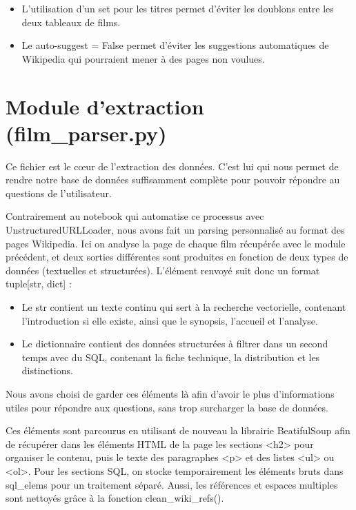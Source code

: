 \documentclass[11pt]{report}
\begin{document}
    \begin{itemize}
        \item L'utilisation d'un set pour les titres permet d'éviter les doublons entre les deux tableaux de
        films.
        \item Le auto-suggest = False permet d'éviter les suggestions automatiques de Wikipedia qui
        pourraient mener à des pages non voulues.
    \end{itemize}
 
    \section{Module d'extraction (film\_parser.py)}
 
    Ce fichier est le cœur de l'extraction des données. C'est lui qui nous permet de rendre notre base de
    données suffisamment complète pour pouvoir répondre au questions de l'utilisateur.
 
    Contrairement au notebook qui automatise ce processus avec UnstructuredURLLoader, nous avons
    fait un parsing personnalisé au format des pages Wikipedia. Ici on analyse la page de chaque film
    récupérée avec le module précédent, et deux sorties différentes sont produites en fonction de deux
    types de données (textuelles et structurées). L'élément renvoyé suit donc un format tuple[str, dict] :
 
    \begin{itemize}
        \item Le str contient un texte continu qui sert à la recherche vectorielle, contenant l'introduction si
        elle existe, ainsi que le synopsis, l'accueil et l'analyse.
        \item Le dictionnaire contient des données structurées à filtrer dans un second temps avec du
        SQL, contenant la fiche technique, la distribution et les distinctions.
    \end{itemize}
 
    Nous avons choisi de garder ces éléments là afin d'avoir le plus d'informations utiles pour répondre
    aux questions, sans trop surcharger la base de données.
 
    Ces éléments sont parcourus en utilisant de nouveau la librairie BeatifulSoup afin de récupérer dans
    les éléments HTML de la page les sections <h2> pour organiser le contenu, puis le texte des
    paragraphes <p> et des listes <ul> ou <ol>. Pour les sections SQL, on stocke temporairement les
    éléments bruts dans sql\_elems pour un traitement séparé. Aussi, les références et espaces multiples
    sont nettoyés grâce à la fonction clean\_wiki\_refs().
 
\end{document}
